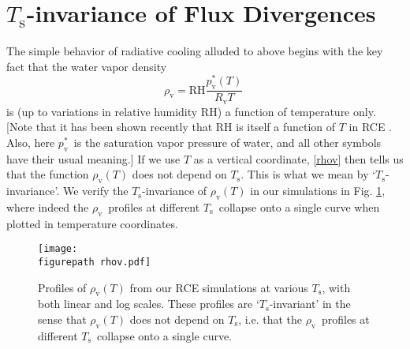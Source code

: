\documentclass[9pt,twocolumn,twoside,lineno]{pnas-new}
\newcommand{\beqn}{\begin{equation}}
\newcommand{\eeqn}{\end{equation}}
\newcommand{\rhov}{\ensuremath{\rho_\mathrm{v}}}
\newcommand{\Rv}{\ensuremath{R_\mathrm{v}}}
\newcommand{\pvstar}{\ensuremath{p^*_{\mathrm{v}}}}
\newcommand{\Ts}{\ensuremath{T_\mathrm{s}}}
\newcommand{\RH}{\ensuremath{\mathrm{RH}}}
\newcommand{\figurepath}{./}
\begin{document}
\section{\Ts-invariance of Flux Divergences}
\label{Ts_invariance}
The simple behavior of radiative cooling alluded to above begins with the key fact that  the water vapor density 
	\beqn
		\rhov =  \RH\frac{\pvstar(T)}{\Rv T} \; 
	\label{rhov}
	\eeqn
	 is (up to variations in relative humidity \RH) a function of temperature only. [Note that it has been shown recently that RH is itself a function of $T$ in RCE \cite{romps2014}. Also, here \pvstar\  is the saturation vapor pressure of water, and all other symbols have their usual meaning.] If we use $T$ as a vertical coordinate, \eqref{rhov} then tells us that the function $\rhov(T)$ does not depend on \Ts. This is what we mean by `\Ts-invariance'. We verify the \Ts-invariance of $\rhov(T)$  in our simulations in  Fig. \ref{rhov_fig}, where indeed  the \rhov\ profiles at different \Ts\ collapse onto a single curve when plotted in temperature coordinates.

\begin{figure}[t]
	\begin{center}
			\texttt{[image: \\figurepath rhov.pdf]}
		\caption{Profiles of $\rhov(T)$ from our RCE simulations at various \Ts, with both linear and log scales. These profiles are `\Ts-invariant' in the sense that $\rhov(T)$ does not depend on \Ts, i.e. that the \rhov\ profiles at different \Ts\ collapse onto a single curve.
		\label{rhov_fig}
		}
	\end{center}
\end{figure}
\end{document}
